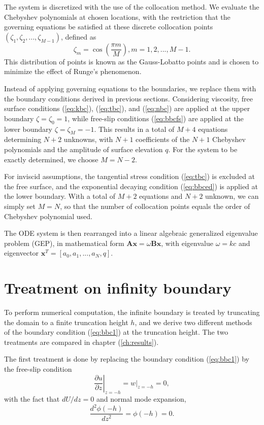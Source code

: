 The system is discretized with the use of the collocation method. We evaluate the Chebyshev polynomials at chosen locations, with the restriction that the governing equations be satisfied at these discrete collocation points $(\zeta_1,\zeta_2,...,\zeta_{M-1})$, defined as
\begin{equation}
    \zeta_m=\cos(\frac{\pi m}{M}), m = 1,2,...,M-1.
\end{equation}
This distribution of points is known as the Gauss-Lobatto points and is chosen to minimize the effect of Runge's phenomenon. 

Instead of applying governing equations to the boundaries, we replace them with the boundary conditions derived in previous sections. Considering viscosity, free surface conditions (\ref{eq:kbc}), (\ref{eq:tbc}), and (\ref{eq:nbc}) are applied at the upper boundary $\zeta=\zeta_0=1$, while free-slip conditions (\ref{eq:bbcfs}) are applied at the lower boundary $\zeta=\zeta_M=-1$. This results in a total of $M+4$ equations determining $N+2$ unknowns, with $N+1$ coefficients of the $N+1$ Chebyshev polynomials and the amplitude of surface elevation $q$. For the system to be exactly determined, we choose $M=N-2$.

For inviscid assumptions, the tangential stress condition (\ref{eq:tbc}) is excluded at the free surface, and the exponential decaying condition (\ref{eq:bbced}) is applied at the lower boundary. With a total of $M+2$ equations and $N+2$ unknown, we can simply set $M=N$, so that the number of collocation points equals the order of Chebyshev polynomial used.

The ODE system is then rearranged into a linear algebraic generalized eigenvalue problem (GEP), in mathematical form $\boldsymbol{Ax}=\omega\boldsymbol{Bx}$, with eigenvalue $\omega=kc$ and eigenvector $\boldsymbol{x}^T=[a_0,a_1,...,a_N,q]$. 

\section{Treatment on infinity boundary}
To perform numerical computation, the infinite boundary is treated by truncating the domain to a finite truncation height $h$, and we derive two different methods of the boundary condition (\ref{eq:bbc1}) at the truncation height. The two treatments are compared in chapter (\ref{ch:results}).

The first treatment is done by replacing the boundary condition (\ref{eq:bbc1}) by the free-slip condition
\begin{equation}
    \left.\frac{\partial u}{\partial z}\right|_{z=-h}=\left.w\right|_{z=-h}=0,
\end{equation}
with the fact that $dU/dz=0$ and normal mode expansion,
\begin{equation}
    \frac{d^2\phi(-h)}{dz^2}=\phi(-h)=0.
    \label{eq:bbcfs}
\end{equation}

